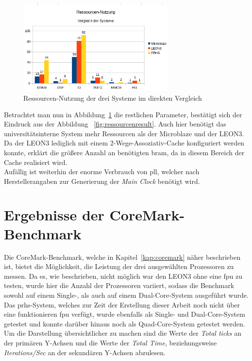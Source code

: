 \begin{figure}[H]
\centering
\includegraphics[width=0.7\textwidth]{Hauptteil/ressourcenresult1.png}
\caption{Ressourcen-Nutzung der drei Systeme im direkten Vergleich}
\label{fig:ressourcenresult1}
\end{figure}

Betrachtet man nun in Abbildung~\ref{fig:ressourcenresult1} die restlichen Parameter, bestätigt sich der Eindruck aus der Abbildung
~\ref{fig:ressourcenresult}. Auch hier benötigt das universitätsinterne System mehr Ressourcen als der Microblaze und der LEON3.
Da der LEON3 lediglich mit einem 2-Wege-Assoziativ-Cache konfiguriert werden konnte, erklärt die größere Anzahl an
benötigten \ac{bram}, da in diesem Bereich der Cache realisiert wird.\\
Aufällig ist weiterhin der enorme Verbrauch von \ac{pll}, welcher nach Herstellerangaben zur Generierung der \emph{Main Clock}
benötigt wird.\\

\section{Ergebnisse der CoreMark-Benchmark}\label{kap:coremarktest}
Die CoreMark-Benchmark, welche in Kapitel~\ref{kap:coremark} näher beschrieben ist, bietet die Möglichkeit, die Leistung der drei ausgewählten Prozessoren zu messen. Da es, wie beschrieben,
nicht möglich war den LEON3 ohne eine \ac{fpu} zu testen, wurde hier die Anzahl der Prozessoren variiert, sodass die Benchmark sowohl auf einem Single-, als auch auf einem Dual-Core-System
ausgeführt wurde.\\
Das \ac{prhs}-System, welches zur Zeit der Erstellung dieser Arbeit noch nicht über eine funktionieren \ac{fpu} verfügt, wurde ebenfalls als Single- und Dual-Core-System getestet und konnte
darüber hinaus noch als Quad-Core-System getestet werden.\\
Um die Darstellung übersichtlicher zu machen sind die Werte der \emph{Total ticks} an der primären Y-Achsen und die Werte der \emph{Total Time}, beziehungsweise \emph{Iterations/Sec}
an der sekundären Y-Achsen abzulesen.\\

